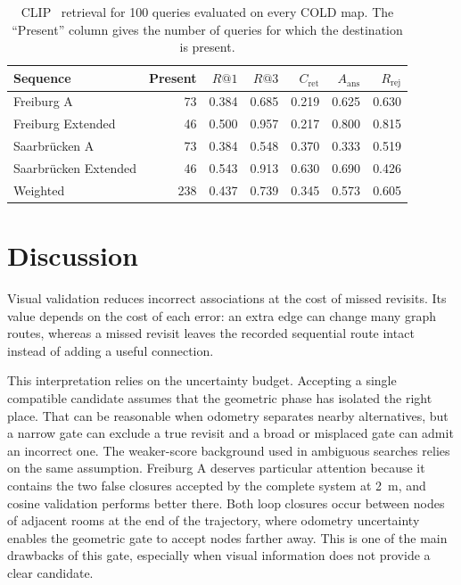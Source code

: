 \documentclass[5p,twocolumn,nonatbib,reversenotenum]{elsarticle}
\begin{document}
\begin{table}[!htbp]
    \centering
    \caption{CLIP~\cite{radford2021learningtransferablevisualmodels} retrieval for 100 queries evaluated on every COLD map. The ``Present'' column gives the number of queries for which the destination is present.}
    \label{tab:language}
    \footnotesize
    \setlength{\tabcolsep}{2pt}
    \begin{tabular}{@{}lrrrrrr@{}}
    \hline
    Sequence & Present & $R@1$ & $R@3$ & $C_{\mathrm{ret}}$ & $A_{\mathrm{ans}}$ & $R_{\mathrm{rej}}$\\
    \hline
    Freiburg A              & 73 & 0.384 & 0.685 & 0.219 & 0.625 & 0.630\\
    Freiburg Extended       & 46 & 0.500 & 0.957 & 0.217 & 0.800 & 0.815\\
    Saarbr\"ucken A        & 73 & 0.384 & 0.548 & 0.370 & 0.333 & 0.519\\
    Saarbr\"ucken Extended & 46 & 0.543 & 0.913 & 0.630 & 0.690 & 0.426\\
    \hline
    Weighted                & 238 & 0.437 & 0.739 & 0.345 & 0.573 & 0.605\\
    \hline
    \end{tabular}
\end{table}

\section{Discussion}
Visual validation reduces incorrect associations at the cost of missed revisits. Its value depends on the cost of each error: an extra edge can change many graph routes, whereas a missed revisit leaves the recorded sequential route intact instead of adding a useful connection.

This interpretation relies on the uncertainty budget. Accepting a single compatible candidate assumes that the geometric phase has isolated the right place. That can be reasonable when odometry separates nearby alternatives, but a narrow gate can exclude a true revisit and a broad or misplaced gate can admit an incorrect one. The weaker-score background used in ambiguous searches relies on the same assumption. Freiburg A deserves particular attention because it contains the two false closures accepted by the complete system at \qty{2}{\metre}, and cosine validation performs better there. Both loop closures occur between nodes of adjacent rooms at the end of the trajectory, where odometry uncertainty enables the geometric gate to accept nodes farther away. This is one of the main drawbacks of this gate, especially when visual information does not provide a clear candidate.
\end{document}
